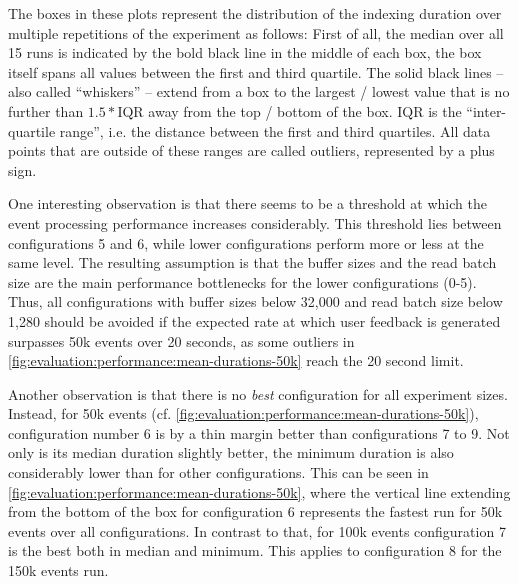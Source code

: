 The boxes in these plots represent the distribution of the indexing duration over multiple repetitions of the experiment as follows:
First of all, the median over all 15 runs is indicated by the bold black line in the middle of each box, the box itself spans all values between the first and third quartile.
The solid black lines -- also called ``whiskers'' -- extend from a box to the largest / lowest value that is no further than $ 1.5 * \text{IQR} $ away from the top / bottom of the box.
$\text{IQR}$ is the ``inter-quartile range'', i.e. the distance between the first and third quartiles.
All data points that are outside of these ranges are called outliers, represented by a plus sign.

One interesting observation is that there seems to be a threshold at which the event processing performance increases considerably.
This threshold lies between configurations 5 and 6, while lower configurations perform more or less at the same level.
The resulting assumption is that the buffer sizes and the read batch size are the main performance bottlenecks for the lower configurations (0-5).
Thus, all configurations with buffer sizes below 32,000 and read batch size below 1,280 should be avoided if the expected rate at which user feedback is generated surpasses 50k events over 20 seconds, as some outliers in \cref{fig:evaluation:performance:mean-durations-50k} reach the 20 second limit.

Another observation is that there is no \emph{best} configuration for all experiment sizes.
Instead, for 50k events (cf. \cref{fig:evaluation:performance:mean-durations-50k}), configuration number 6 is by a thin margin better than configurations 7 to 9.
Not only is its median duration slightly better, the minimum duration is also considerably lower than for other configurations.
This can be seen in \cref{fig:evaluation:performance:mean-durations-50k}, where the vertical line extending from the bottom of the box for configuration 6 represents the fastest run for 50k events over all configurations.
In contrast to that, for 100k events configuration 7 is the best both in median and minimum.
This applies to configuration 8 for the 150k events run.

